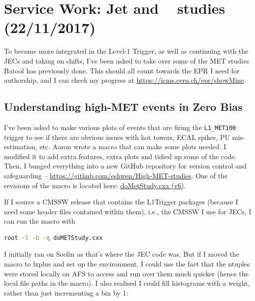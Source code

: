 \newpage
\section{Service Work: Jet and \texorpdfstring{\etmiss\ }{ETmiss} studies (22/11/2017)}

To become more integrated in the Level-1 Trigger, as well as continuing with the JECs and taking on shifts, I've been asked to take over some of the MET studies Batool has previously done. This should all count towards the EPR I need for authorship, and I can check my progress at \url{https://icms.cern.ch/epr/showMine}.

\subsection{Understanding high-MET events in Zero Bias}

I've been asked to make various plots of events that are firing the \texttt{L1\_MET100} trigger to see if there are obvious issues with hot towers, ECAL spikes, PU mis-estimation, etc. Aaron wrote a macro that can make some plots needed. I modified it to add extra features, extra plots and tidied up some of the code. Then, I bunged everything into a new GitHub repository for version control and safeguarding -- \url{https://github.com/eshwen/High-MET-studies}. One of the revisions of the macro is located here: \href{run:sec34/MET_studies_v6/doMetStudy.cxx}{doMetStudy.cxx (v6)}.

If I source a CMSSW release that contains the L1Trigger packages (because I need some header files contained within them), i.e., the CMSSW I use for JECs, I can run the macro with

\begin{lstlisting}[belowskip=-0.7cm, language=sh, numbers=none]
root -l -b -q doMETStudy.cxx
\end{lstlisting}

I initially ran on Soolin as that's where the JEC code was. But if I moved the macro to lxplus and set up the environment, I could use the fact that the ntuples were stored locally on AFS to access and run over them much quicker (hence the local file paths in the macro). I also realised I could fill histograms with a weight, rather than just incrementing a bin by 1:



